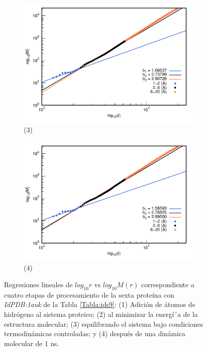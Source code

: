 \begin{figure}[H]
	\vspace{0cm} %
	
	\hspace{-0.3cm} 
	\begin{subfigure}{0.49\textwidth}
		\centering
		\includegraphics[width=\linewidth,page=1]{graphs/PDBs/1auk/1aukEq.pdf}
		\caption{(3)}
	\end{subfigure}
	\hspace{0.2cm}
	\begin{subfigure}{0.49\textwidth} %
		\centering
		\includegraphics[width=\linewidth,page=1]{graphs/PDBs/1auk/1auk1ns.pdf}
		\caption{(4)}
	\end{subfigure}
	\caption{Regresiones lineales de $log_{10}r$ vs $log_{10}M(r)$ correspondiente a cuatro etapas de procesamiento de la sexta prote\'{i}na con \textit{IdPDB:1auk} de la Tabla \ref{Tabla:ids9}: (1) Adici\'{o}n de \'{a}tomos de hidr\'{o}geno al sistema proteico; (2) al minimizar la energ\'{i´}a de la estructura molecular; (3) equilibrando el sistema bajo condiciones termodin\'{a}micas controladas; y (4) despu\'{e}s de una din\'{a}mica molecular de 1 ns.}
	\label{fig:1auk}
\end{figure}

